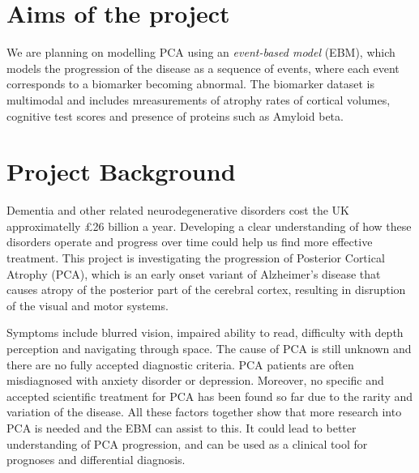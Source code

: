 \documentclass[12pt,a4paper,oneside]{report}
\begin{document}
\section*{Aims of the project}

We are planning on modelling PCA using an \textit{event-based model} (EBM), which models the progression of the disease as a sequence of events, where each event corresponds to a biomarker becoming abnormal. The biomarker dataset is multimodal and includes mreasurements of atrophy rates of cortical volumes, cognitive test scores and presence of proteins such as Amyloid beta.


\section*{Project Background}

Dementia and other related neurodegenerative disorders cost the UK approximatelly \pounds 26 billion a year. Developing a clear understanding of how these disorders operate and progress over time could help us find more effective treatment. This project is investigating the progression of Posterior Cortical Atrophy (PCA), which is an early onset variant of Alzheimer's disease that causes atropy of the posterior part of the cerebral cortex, resulting in disruption of the visual and motor systems. 

Symptoms include blurred vision, impaired ability to read, difficulty with depth perception and navigating through space. The cause of PCA is still unknown and there are no fully accepted diagnostic criteria. PCA patients are often misdiagnosed with anxiety disorder or depression. Moreover, no specific and accepted scientific treatment for PCA has been found so far due to the rarity and variation of the disease.  All these factors together show that more research into PCA is needed and the EBM can assist to this. It could lead to better understanding of PCA progression, and can be used as a clinical tool for prognoses and differential diagnosis. 
\end{document}

